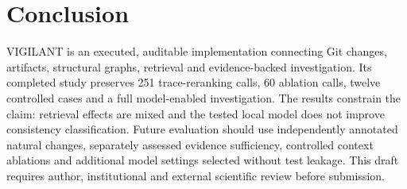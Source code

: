 \documentclass[conference,a4paper]{IEEEtran}
\begin{document}
\balance
\section{Conclusion}
VIGILANT is an executed, auditable implementation connecting Git changes, artifacts, structural graphs, retrieval and evidence-backed investigation. Its completed study preserves 251 trace-reranking calls, 60 ablation calls, twelve controlled cases and a full model-enabled investigation. The results constrain the claim: retrieval effects are mixed and the tested local model does not improve consistency classification. Future evaluation should use independently annotated natural changes, separately assessed evidence sufficiency, controlled context ablations and additional model settings selected without test leakage. This draft requires author, institutional and external scientific review before submission.
\end{document}
